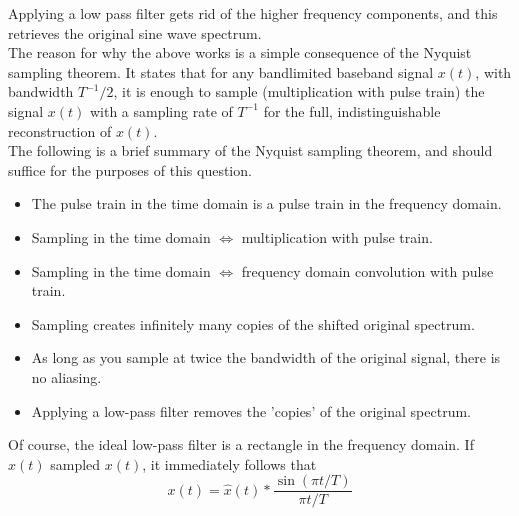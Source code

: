 \documentclass[../../main.tex]{subfiles}
\begin{document}
Applying a low pass filter gets rid of the higher frequency components, and this retrieves the original sine wave spectrum.\\
    
    The reason for why the above works is a simple consequence of the Nyquist sampling theorem. It states that for any bandlimited baseband signal $x(t)$, with bandwidth $T^{-1}/2$, it is enough to sample (multiplication with pulse train) the signal $x(t)$ with a sampling rate of $T^{-1}$ for the full, indistinguishable reconstruction of $x(t)$.\\
    
    The following is a brief summary of the Nyquist sampling theorem, and should suffice for the purposes of this question.
    \begin{itemize}
        \item The pulse train in the time domain is a pulse train in the frequency domain.
        \item Sampling in the time domain $\iff$ multiplication with pulse train.
        \item Sampling in the time domain $\iff$ frequency domain convolution with pulse train.
        \item Sampling creates infinitely many copies of the shifted original spectrum.
        \item As long as you sample at twice the bandwidth of the original signal, there is no aliasing.
        \item Applying a low-pass filter removes the 'copies' of the original spectrum.
    \end{itemize}
    Of course, the ideal low-pass filter is a rectangle in the frequency domain. If $\hat{x}(t)$ sampled $x(t)$, it immediately follows that
    \[
    x(t) = \hat{x}(t)\ast\dfrac{\sin(\pi t/T)}{\pi t/T}
    \]
\end{document}
